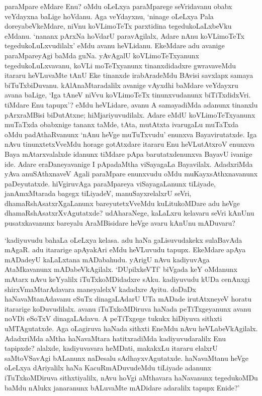 paraMpare eMdare Enu? oMdu oLeLxya paraMparege seVridavanu obabx veYdayxna baLige hoVdanu. Aga veYdayxnu, `ninage oLeLxya Pala doreyabeVkeMdare, niVnu koVLimoTeTx parxtidina tegedukoLaLxbeVku eMdanu. `nananx pArxNa hoVdarU paravAgilalx, Adare nAnu koVLimoTeTx tegedukoLuLxvudilalx' eMdu avanu heVLidanu. EkeMdare adu avanige paraMpareyAgi baMda guNa. yAvAgalU koVLimoTeTxyanunx tegedukoLuLxvavanu, koVLi moTeTxyanunx tinanxdidadxre gwravaveMdu itararu heVLuvaMte tAnU Eke tinanxde irabAradeMdu BAvisi savxlapx samaya biTuTxbiDuvanu. kAlAnaMtaradalilx avanige vAyxdhi baMdare veYdayxru avana baLige, `Iga tAneV niVvu koVLimoTeTx tinunxvudanunx biTiTxdidxVri. tiMdare Enu tapupx'? eMdu heVLidare, avanu A samayadiMda adanunx tinanxlu pArxraMBisi biDutAtxne; hiMjariyuvudilalx. Adare eMdU koVLimoTeTxyanunx muTaTxda obabxnige tananx taMde, tAta, mutAtxta ivarugaLu muTaTxda oMdu padAthaRvanunx `nAnu heVge muTuTxvudu' enunxva Bayavirutatxde. Iga nAvu tinunxtetxVveMdu horage gotAtxdare itararu Enu heVLutAtxroV enunxva Baya mAtarxvalalxde idanunx tiMdare pApa barutatxdenunxva BayavU ivanige ide. Adare eraDaneyavanige I pApadaMtha viSayagaLa Bayavilalx. AdadxriMda yAva anuSAthxnaveV Agali paraMpare enunxvudu oMdu muKayxsAthxnavanunx paDeyutatxde. hiVgiruvAga paraMpareya viSayagaLanunx tiLiyade, janAmxMtarada bagegx tiLiyadeV, manuSayxrelalxrU seVri, dhamaRshAsatxrXgaLanunx bareyutetxVveMdu kuLitukoMDare adu heVge dhamaRshAsatxrXvAgutatxde? udAharaNege, kaLaLxru kelavaru seVri kAnUnu pusatxkavanunx bareyalu AraMBisidare heVge avaru kAnUnu mADuvaru?

`kadiyuvudu bahaLa oLeLxya kelasa. adu haNa gaLisuvudakekx sulaBavAda mAgaR. adu itararige apAyakAri eMdu heVLuvudu tapupx. EkeMdare apAya mADadeyU kaLaLxtana mADabahudu. yArigU nAvu kadiyuvAga AtaMkavanunx mADabeVkAgilalx. `DUpilxkeVTf' biVgada keY oMdanunx mAtarx nAvu keYyalilx iTuTxkoMDidadxre sAku. kadiyuvudu kUDa cenAnxgi shirxVmaMtarAdavara maneyalelxV kadadxre Ayitu. doDaDx haNavaMtanAdavanu eSuTx dinagaLAdarU UTa mADade irutAtxneyeV horatu itararige koDuvudilalx. avanu iTuTxkoMDiruva haNada peTiTxgeyanunx avanu noVDi eSoTxV dinagaLAdavu. A peTiTxgege tukukx hiDiyuva sithxti uMTAgutatxde. Aga oLagiruva haNada sithxti EneMdu nAvu heVLabeVkAgilalx. AdadxriMda aMtha haNavaMtara hatitxradiMda kadiyuvudaralilx Enu tapipxde? alalxde, kadiyuvavara heMDati, makakxLu itararu elalxrU saMtoVSavAgi bALanunx naDesalu sAdhayxvAgutatxde. haNavaMtanu heVge oLeLxya dAriyalilx haNa KacuRmADuvudeMdu tiLiyade adanunx iTuTxkoMDiruva sithxtiyalilx, nAvu hoVgi aMthavara haNavanunx tegedukoMDu baMdu nAlukx janaranunx bALuvaMte mADidare adaralilx tapupx Enide?'

